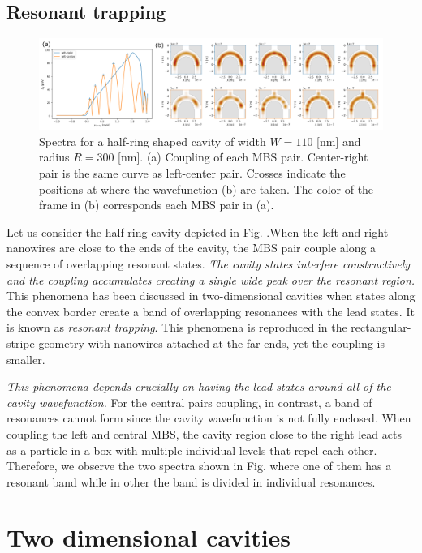 \subsection{Resonant trapping}

\begin{figure}[h!]
\centering
  \includegraphics[width=\linewidth]{figures/resonant_trapping_ring.pdf}
  \caption{Spectra for a half-ring shaped cavity of width $W=110$ [nm] and radius $R=300$ [nm]. (a) Coupling of each MBS pair. Center-right pair is the same curve as left-center pair. Crosses indicate the positions at where the wavefunction (b) are taken. The color of the frame in (b) corresponds each MBS pair in (a).}
  \label{fig:resonant_trapping}
\end{figure}

Let us consider the half-ring cavity depicted in Fig. .When the left and right nanowires are close to the ends of the cavity, the MBS pair couple along a sequence of overlapping resonant states.
\textit{The cavity states interfere constructively and the coupling accumulates creating a single wide peak over the resonant region.}
This phenomena has been discussed in two-dimensional cavities when states along the convex border create a band of overlapping resonances with the lead states.
It is known as \textit{resonant trapping}.
This phenomena is reproduced in the rectangular-stripe geometry with nanowires attached at the far ends, yet the coupling is smaller.

\textit{This phenomena depends crucially on having the lead states around all of the cavity wavefunction.}
For the central pairs coupling, in contrast, a band of resonances cannot form since the cavity wavefunction is not fully enclosed.
When coupling the left and central MBS, the cavity region close to the right lead acts as a particle in a box with multiple individual levels that repel each other.
Therefore, we observe the two spectra shown in Fig. where one of them has a resonant band while in other the band is divided in individual resonances.

\section{Two dimensional cavities}

